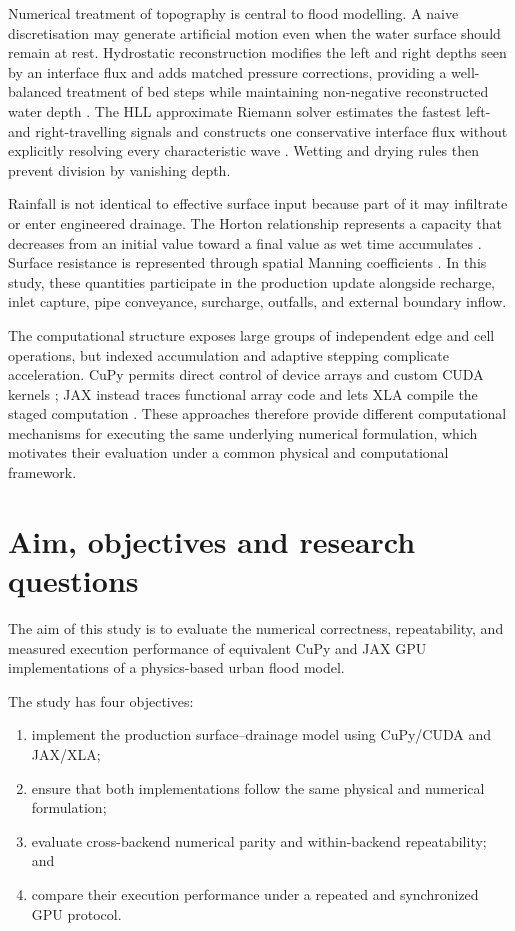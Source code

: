 \documentclass[11pt,a4paper,oneside]{report}
\begin{document}
Numerical treatment of topography is central to flood modelling. A naive discretisation may
generate artificial motion even when the water surface should remain at rest. Hydrostatic
reconstruction modifies the left and right depths seen by an interface flux and adds matched
pressure corrections, providing a well-balanced treatment of bed steps while maintaining
non-negative reconstructed water depth \cite{audusse2004}. The HLL approximate Riemann
solver estimates the fastest left- and right-travelling signals and constructs one
conservative interface flux without explicitly resolving every characteristic wave
\cite{harten1983}. Wetting and drying rules then prevent division by vanishing depth.

Rainfall is not identical to effective surface input because part of it may infiltrate or
enter engineered drainage. The Horton relationship represents a capacity that decreases
from an initial value toward a final value as wet time accumulates \cite{horton1933}.
Surface resistance is represented through spatial Manning coefficients
\cite{chow1959}. In this study, these quantities participate in the production update
alongside recharge, inlet capture, pipe conveyance, surcharge, outfalls, and external
boundary inflow.

The computational structure exposes large groups of independent edge and cell operations,
but indexed accumulation and adaptive stepping complicate acceleration. CuPy permits direct
control of device arrays and custom CUDA kernels \cite{cupy}; JAX instead traces functional
array code and lets XLA compile the staged computation \cite{jax}. These approaches therefore
provide different computational mechanisms for executing the same underlying numerical
formulation, which motivates their evaluation under a common physical and computational
framework.

\section{Aim, objectives and research questions}

The aim of this study is to evaluate the numerical correctness, repeatability, and measured
execution performance of equivalent CuPy and JAX GPU implementations of a physics-based
urban flood model.

The study has four objectives:
\begin{enumerate}
    \item implement the production surface--drainage model using CuPy/CUDA and JAX/XLA;
    \item ensure that both implementations follow the same physical and numerical formulation;
    \item evaluate cross-backend numerical parity and within-backend repeatability; and
    \item compare their execution performance under a repeated and synchronized GPU protocol.
\end{enumerate}
\end{document}
